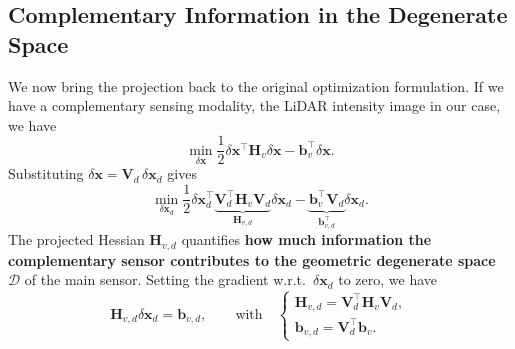 \subsection{Complementary Information in the Degenerate Space}
We now bring the projection back to the original optimization formulation. If we have a complementary sensing modality, the LiDAR intensity image in our case, we have
\begin{equation}
    \min_{\delta\mathbf{x}} \frac{1}{2}\delta\mathbf{x}^{\top}\mathbf{H}_v\delta\mathbf{x} - \mathbf{b}_v^{\top}\delta\mathbf{x}.
\end{equation}
Substituting $\delta\mathbf{x} = \mathbf{V}_d\,\delta\mathbf{x}_d$ gives
\begin{equation}
    \min_{\delta\mathbf{x}_d} \frac{1}{2}\delta\mathbf{x}_d^{\top}\underbrace{\mathbf{V}_d^{\top}\mathbf{H}_v\mathbf{V}_d}_{\mathbf{H}_{v,d}}\delta\mathbf{x}_d - \underbrace{\mathbf{b}_v^{\top}\mathbf{V}_d}_{\mathbf{b}_{v,d}^{\top}}\delta\mathbf{x}_d.
\end{equation}
The projected Hessian $\mathbf{H}_{v,d}$ quantifies \textbf{how much information the complementary sensor contributes to the geometric degenerate space $\mathcal{D}$} of the main sensor. Setting the gradient w.r.t.\ $\delta\mathbf{x}_d$ to zero, we have
\begin{equation}
    \mathbf{H}_{v,d}\delta\mathbf{x}_d = \mathbf{b}_{v,d}, \qquad \text{with} \quad
    \begin{cases}
        \mathbf{H}_{v,d} = \mathbf{V}_d^{\top}\mathbf{H}_v\mathbf{V}_d, \\
        \mathbf{b}_{v,d} = \mathbf{V}_d^{\top}\mathbf{b}_v.
    \end{cases}
\end{equation}

